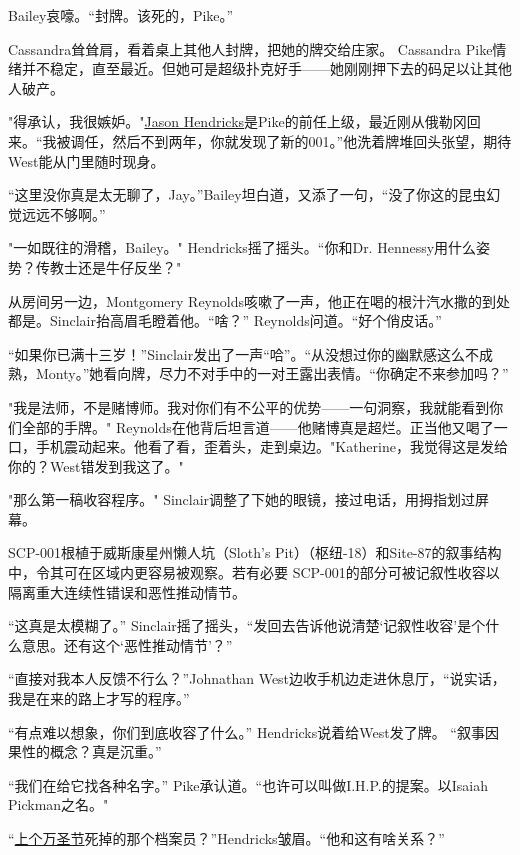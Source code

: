 Bailey哀嚎。“封牌。该死的，Pike。”

Cassandra耸耸肩，看着桌上其他人封牌，把她的牌交给庄家。 Cassandra Pike情绪并不稳定，直至最近。但她可是超级扑克好手——她刚刚押下去的码足以让其他人破产。

"得承认，我很嫉妒。"\hyperref[chap:]{Jason Hendricks}是Pike的前任上级，最近刚从俄勒冈回来。“我被调任，然后不到两年，你就发现了新的001。”他洗着牌堆回头张望，期待West能从门里随时现身。

“这里没你真是太无聊了，Jay。”Bailey坦白道，又添了一句，“没了你这的昆虫幻觉远远不够啊。”

"一如既往的滑稽，Bailey。" Hendricks摇了摇头。“你和Dr. Hennessy用什么姿势？传教士还是牛仔反坐？"

从房间另一边，Montgomery Reynolds咳嗽了一声，他正在喝的根汁汽水撒的到处都是。Sinclair抬高眉毛瞪着他。“啥？” Reynolds问道。“好个俏皮话。”

“如果你已满十三岁！”Sinclair发出了一声“哈”。“从没想过你的幽默感这么不成熟，Monty。”她看向牌，尽力不对手中的一对王露出表情。“你确定不来参加吗？”

"我是法师，不是赌博师。我对你们有不公平的优势——一句洞察，我就能看到你们全部的手牌。" Reynolds在他背后坦言道——他赌博真是超烂。正当他又喝了一口，手机震动起来。他看了看，歪着头，走到桌边。"Katherine，我觉得这是发给你的？West错发到我这了。"

"那么第一稿收容程序。" Sinclair调整了下她的眼镜，接过电话，用拇指划过屏幕。

\begin{scpbox}

SCP-001根植于威斯康星州懒人坑（Sloth's Pit）（枢纽-18）和Site-87的叙事结构中，令其可在区域内更容易被观察。若有必要 SCP-001的部分可被记叙性收容以隔离重大连续性错误和恶性推动情节。

\end{scpbox}

“这真是太模糊了。” Sinclair摇了摇头，“发回去告诉他说清楚‘记叙性收容’是个什么意思。还有这个‘恶性推动情节’？”

“直接对我本人反馈不行么？”Johnathan West边收手机边走进休息厅，“说实话，我是在来的路上才写的程序。”

“有点难以想象，你们到底收容了什么。” Hendricks说着给West发了牌。 “叙事因果性的概念？真是沉重。”

“我们在给它找各种名字。” Pike承认道。“也许可以叫做I.H.P.的提案。以Isaiah Pickman之名。"

“\hyperref[chap:]{上个万圣节}死掉的那个档案员？”Hendricks皱眉。“他和这有啥关系？”

